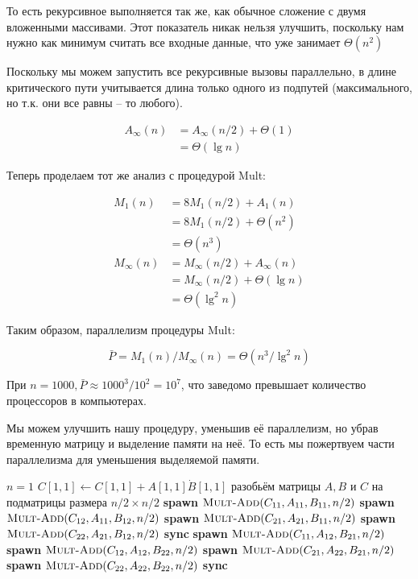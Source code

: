 \documentclass[a4paper,11pt]{article}
\begin{document}
То есть рекурсивное выполняется так же, как обычное сложение с двумя вложенными
массивами. Этот показатель никак нельзя улучшить, поскольку нам нужно как
минимум считать все входные данные, что уже занимает $\Theta(n^2)$

Поскольку мы можем запустить все рекурсивные вызовы параллельно, в длине
критического пути учитывается длина только одного из подпутей (максимального, но
т.к. они все равны -- то любого).

\begin{align*}
  A_{\infty}(n) &= A_{\infty}(n/2) + \Theta(1) \\
    &= \Theta(\lg n)
\end{align*}

Теперь проделаем тот же анализ с процедурой Mult:

\begin{align*}
  M_1(n) &= 8M_1(n/2) + A_1(n) \\
    &= 8M_1(n/2) + \Theta(n^2) \\
    &= \Theta(n^3) \\
  M_{\infty}(n) &= M_{\infty}(n/2) + A_{\infty}(n) \\
    &= M_{\infty}(n/2) + \Theta(\lg n) \\
    &= \Theta(\lg^2 n)
\end{align*}

Таким образом, параллелизм процедуры Mult:

$$
\bar{P} = M_1(n)/M_{\infty}(n) = \Theta(n^3 / \lg^2n)
$$

При $n = 1000, \bar{P} \approx 1000^3 / 10^2 = 10^7$, что заведомо превышает
количество процессоров в компьютерах.

Мы можем улучшить нашу процедуру, уменьшив её параллелизм, но убрав временную
матрицу и выделение памяти на неё. То есть мы пожертвуем части параллелизма для
уменьшения выделяемой памяти.

\begin{codebox}
\li \If $n = 1$
\li \Then $C[1, 1] \gets C[1, 1] + A[1, 1] \dot B[1, 1]$
\li \Return \End
\li разобьём матрицы $A, B$ и $C$ на подматрицы размера $n/2 \times n/2$
\li \textbf{spawn} $\textnormal{\scshape Mult-Add}(C_{11}, A_{11}, B_{11}, n/2)$
\li \textbf{spawn} $\textnormal{\scshape Mult-Add}(C_{12}, A_{11}, B_{12}, n/2)$
\li \textbf{spawn} $\textnormal{\scshape Mult-Add}(C_{21}, A_{21}, B_{11}, n/2)$
\li \textbf{spawn} $\textnormal{\scshape Mult-Add}(C_{22}, A_{21}, B_{12}, n/2)$
\li \textbf{sync}
\li \textbf{spawn} $\textnormal{\scshape Mult-Add}(C_{11}, A_{12}, B_{21}, n/2)$
\li \textbf{spawn} $\textnormal{\scshape Mult-Add}(C_{12}, A_{12}, B_{22}, n/2)$
\li \textbf{spawn} $\textnormal{\scshape Mult-Add}(C_{21}, A_{22}, B_{21}, n/2)$
\li \textbf{spawn} $\textnormal{\scshape Mult-Add}(C_{22}, A_{22}, B_{22}, n/2)$
\li \textbf{sync}
\li \Return
\end{codebox}
\end{document}
